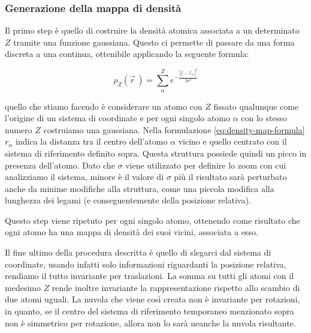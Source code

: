 \documentclass[a4paper,11pt,openany]{book}
\begin{document}
\subsubsection{Generazione della mappa di densità}

Il primo step è quello di costruire la densità atomica associata a un determinato $Z$ tramite una funzione gaussiana. Questo ci permette di passare da una forma discreta a una continua, ottenibile applicando la seguente formula:


\begin{equation}
    \rho_Z (\vec{r} \,) = \sum_{\alpha}^{Z} e^{-\frac{|\vec{r}-\vec{r}_{\alpha}\,|^2}{2\sigma^2}}
    \label{eq:density-map-formula}
\end{equation}

quello che stiamo facendo è considerare un atomo con $Z$ fissato qualunque come l'origine di un sistema di coordinate e per ogni singolo atomo $\alpha$ con lo stesso numero $Z$ costruiamo una gaussiana. Nella formulazione \eqref{eq:density-map-formula} $r_{\alpha}$ indica la distanza tra il centro dell'atomo $\alpha$ vicino e quello centrato con il sistema di riferimento definito sopra. Questa struttura possiede quindi un picco in presenza dell'atomo. Dato che $\sigma$ viene utilizzato per definire lo zoom con cui analizziamo il sistema, minore è il valore di $\sigma$ più il risultato sarà perturbato anche da minime modifiche alla struttura, come una piccola modifica alla lunghezza dei legami (e conseguentemente della posizione relativa).

Questo step viene ripetuto per ogni singolo atomo, ottenendo come risultato che ogni atomo ha una mappa di densità dei suoi vicini, associata a esso.

Il fine ultimo della procedura descritta è quello di slegarci dal sistema di coordinate, usando infatti solo informazioni riguardanti la posizione relativa, rendiamo il tutto invariante per traslazioni. La somma su tutti gli atomi con il medesimo $Z$ rende inoltre invariante la rappresentazione rispetto allo scambio di due atomi uguali. La nuvola che viene così creata non è invariante per rotazioni, in quanto, se il centro del sistema di riferimento temporaneo menzionato sopra non è simmetrico per rotazione, allora non lo sarà neanche la nuvola risultante.
\end{document}
